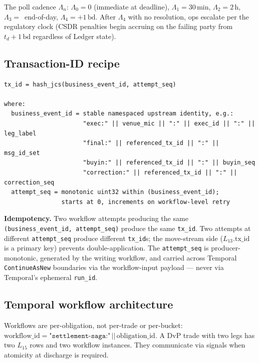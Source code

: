 \documentclass[11pt,a4paper]{article}
\begin{document}
The poll cadence $\Lambda_n$: $\Lambda_0 = 0$ (immediate at deadline), $\Lambda_1 = 30\,\mathrm{min}$, $\Lambda_2 = 2\,\mathrm{h}$, $\Lambda_3 = $~end-of-day, $\Lambda_4 = +1\,\mathrm{bd}$. After $\Lambda_4$ with no resolution, ops escalate per the regulatory clock (CSDR penalties begin accruing on the failing party from $t_d + 1\,\mathrm{bd}$ regardless of Ledger state).

\subsection{Transaction-ID recipe}
\label{sec:tx-id}

\begin{lstlisting}
tx_id = hash_jcs(business_event_id, attempt_seq)

where:
  business_event_id = stable namespaced upstream identity, e.g.:
                      "exec:" || venue_mic || ":" || exec_id || ":" || leg_label
                      "final:" || referenced_tx_id || ":" || msg_id_set
                      "buyin:" || referenced_tx_id || ":" || buyin_seq
                      "correction:" || referenced_tx_id || ":" || correction_seq
  attempt_seq = monotonic uint32 within (business_event_id);
                starts at 0, increments on workflow-level retry
\end{lstlisting}

\textbf{Idempotency.} Two workflow attempts producing the same \texttt{(business\_event\_id, attempt\_seq)} produce the same \texttt{tx\_id}. Two attempts at different \texttt{attempt\_seq} produce different \texttt{tx\_id}s; the move-stream side ($L_{13}.\mathrm{tx\_id}$ is a primary key) prevents double-application. The \texttt{attempt\_seq} is producer-monotonic, generated by the writing workflow, and carried across Temporal \texttt{ContinueAsNew} boundaries via the workflow-input payload --- never via Temporal's ephemeral \texttt{run\_id}.

\subsection{Temporal workflow architecture}
\label{sec:implementation-temporal}

Workflows are per-obligation, not per-trade or per-bucket: $\mathrm{workflow\_id} = \texttt{"settlement-saga:"} \,||\, \mathrm{obligation\_id}$. A DvP trade with two legs has two $L_{15}$ rows and two workflow instances. They communicate via signals when atomicity at discharge is required.
\end{document}
